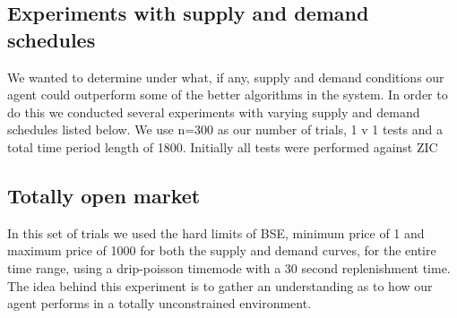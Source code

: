 \documentclass{acm_proc_article-sp}
\begin{document}
\subsection{Experiments with supply and demand schedules}

We wanted to determine under what, if any, supply and demand conditions our
agent could outperform some of the better algorithms in the system. In order to
do this we conducted several experiments with varying supply and demand
schedules listed below. We use n=300 as our number of trials, 1 v 1 tests and a
total time period length of 1800. Initially all tests were performed against
ZIC

\subsection{Totally open market}

In this set of trials we used the hard limits of BSE, minimum price of 1 and
maximum price of 1000 for both the supply and demand curves, for the entire
time range, using a drip-poisson timemode with a 30 second replenishment time.
The idea behind this experiment is to gather an understanding as to how our
agent performs in a totally unconstrained environment.

%

%
%
\appendix
\end{document}
